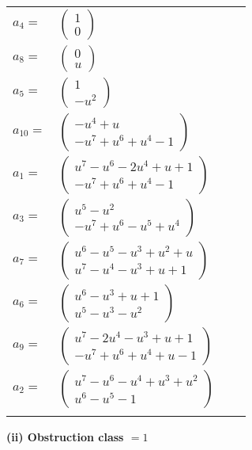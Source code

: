 \documentclass[1p]{elsarticle_modified}
\theoremstyle{definition}
\begin{document}
\begin{tabular}{m{7pt} m{180pt} m{7pt} m{180pt} }
\flushright $a_{4}=$&$\begin{pmatrix}1\\0\end{pmatrix}$ \\
\flushright $a_{8}=$&$\begin{pmatrix}0\\u\end{pmatrix}$ \\
\flushright $a_{5}=$&$\begin{pmatrix}1\\- u^2\end{pmatrix}$ \\
\flushright $a_{10}=$&$\begin{pmatrix}- u^4+u\\- u^7+u^6+u^4-1\end{pmatrix}$ \\
\flushright $a_{1}=$&$\begin{pmatrix}u^7- u^6-2 u^4+u+1\\- u^7+u^6+u^4-1\end{pmatrix}$ \\
\flushright $a_{3}=$&$\begin{pmatrix}u^5- u^2\\- u^7+u^6- u^5+u^4\end{pmatrix}$ \\
\flushright $a_{7}=$&$\begin{pmatrix}u^6- u^5- u^3+u^2+u\\u^7- u^4- u^3+u+1\end{pmatrix}$ \\
\flushright $a_{6}=$&$\begin{pmatrix}u^6- u^3+u+1\\u^5- u^3- u^2\end{pmatrix}$ \\
\flushright $a_{9}=$&$\begin{pmatrix}u^7-2 u^4- u^3+u+1\\- u^7+u^6+u^4+u-1\end{pmatrix}$ \\
\flushright $a_{2}=$&$\begin{pmatrix}u^7- u^6- u^4+u^3+u^2\\u^6- u^5-1\end{pmatrix}$\\&\end{tabular}
\flushleft \textbf{(ii) Obstruction class $= 1$}\\~\\
\end{document}
